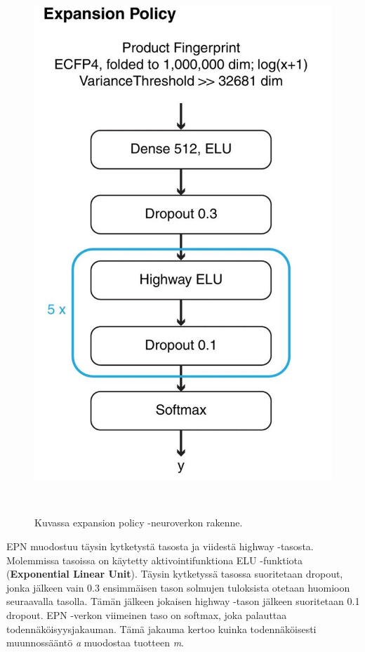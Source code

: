 \documentclass[finnish,twoside,censored,tkt,sw-line]{HYthesisML}
\begin{document}
\begin{figure}
    \centering
    \includegraphics[]{expansion-policy.jpg}
    \caption{Kuvassa expansion policy -neuroverkon rakenne.}
    {~\cite{SeglerMarwinHS2018Pcsw}}
\end{figure}

EPN muodostuu täysin kytketystä tasosta ja viidestä highway -tasosta.
Molemmissa tasoissa on käytetty aktivointifunktiona ELU -funktiota (\textbf{Exponential Linear Unit}).
Täysin kytketyssä tasossa suoritetaan dropout, jonka jälkeen vain 0.3 ensimmäisen tason solmujen tuloksista otetaan huomioon seuraavalla tasolla.
Tämän jälkeen jokaisen highway -tason jälkeen suoritetaan 0.1 dropout.
EPN -verkon viimeinen taso on softmax, joka palauttaa todennäköisyysjakauman.
Tämä jakauma kertoo kuinka todennäköisesti muunnossääntö \emph{a} muodostaa tuotteen \emph{m}.
\end{document}
